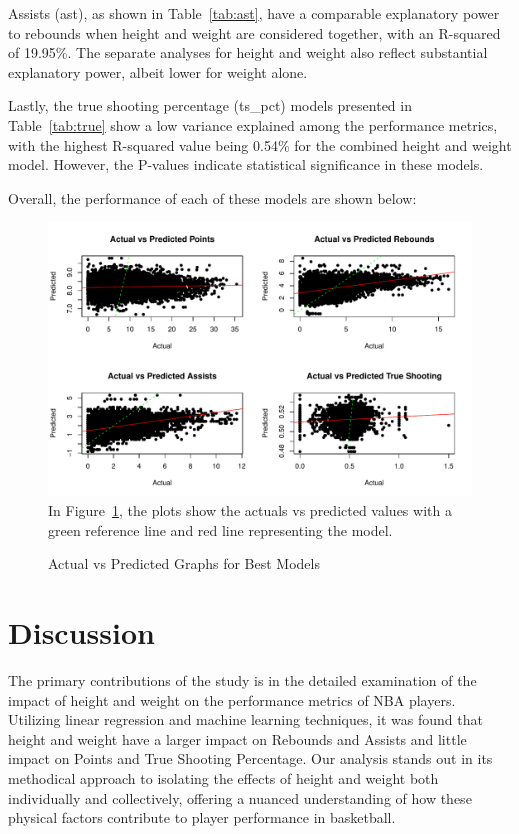 \documentclass[12pt]{article}
\begin{document}
Assists (ast), as shown in Table~\ref{tab:ast}, have a comparable explanatory power to rebounds when height and 
weight are considered together, with an R-squared of 19.95\%. The separate analyses for height and weight also 
reflect substantial explanatory power, albeit lower for weight alone.

Lastly, the true shooting percentage (ts\_pct) models presented in Table~\ref{tab:true} show a low variance explained 
among the performance metrics, with the highest R-squared value being 0.54\% for the combined height and weight 
model. However, the P-values indicate statistical significance in these models.

Overall, the performance of each of these models are shown below:

\begin{figure} [h]
	\caption{Actual vs Predicted Graphs for Best Models}
	\includegraphics[width=1\textwidth]{actuals_vs_predictedgraphs.pdf}
	\label{fig:actpred}
In Figure~\ref{fig:actpred}, the plots show the actuals vs predicted values with a green reference line and red line representing the model.
\end{figure}

\section{Discussion}
\label{sec:disc}

The primary contributions of the study is in the detailed examination of the impact of height and weight on the performance 
metrics of NBA players. Utilizing linear regression and machine learning techniques, it was found that height and weight
have a larger impact on Rebounds and Assists and little impact on Points and True Shooting Percentage. Our analysis stands 
out in its methodical approach to isolating the effects of height and weight both individually and collectively, offering a nuanced 
understanding of how these physical factors contribute to player performance in basketball. 
\end{document}
